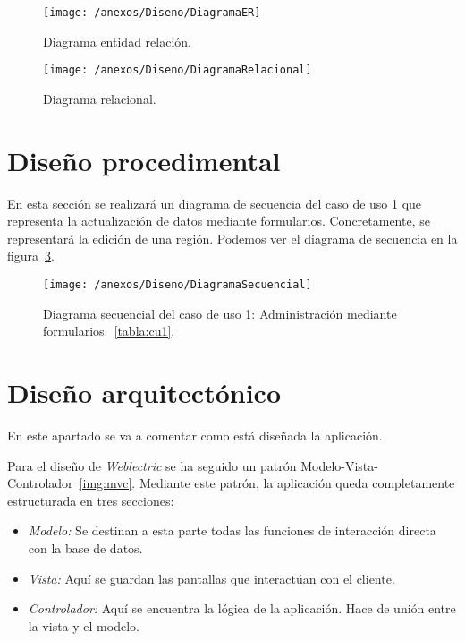 \begin{figure}[h]
	\centering
	\texttt{[image: /anexos/Diseno/DiagramaER]}
	\caption{Diagrama entidad relación.}
	\label{img:modeloER}
\end{figure}

\begin{figure}[h]
	\centering
	\texttt{[image: /anexos/Diseno/DiagramaRelacional]}
	\caption{Diagrama relacional.}
	\label{img:modeloRelacional}
\end{figure}



\newpage

\section{Diseño procedimental}

En esta sección se realizará un diagrama de secuencia del caso de uso 1 que representa la actualización de datos mediante formularios. Concretamente, se representará la edición de una región. Podemos ver el diagrama de secuencia en la figura~\ref{img:modeloSecuencial}.

\begin{figure}[h]
	\centering
	\texttt{[image: /anexos/Diseno/DiagramaSecuencial]}
	\caption{Diagrama secuencial del caso de uso 1: Administración mediante formularios.~\ref{tabla:cu1}.}
	\label{img:modeloSecuencial}
\end{figure}

\newpage

\section{Diseño arquitectónico}

En este apartado se va a comentar como está diseñada la aplicación.

Para el diseño de \textit{Weblectric} se ha seguido un patrón Modelo-Vista-Controlador~\ref{img:mvc}. Mediante este patrón, la aplicación queda completamente estructurada en tres secciones:

\begin{itemize}
	
	\item \textit{Modelo:} Se destinan a esta parte todas las funciones de interacción directa con la base de datos.
	
	\item \textit{Vista:} Aquí se guardan las pantallas que interactúan con el cliente.
	
	\item \textit{Controlador:} Aquí se encuentra la lógica de la aplicación. Hace de unión entre la vista y el modelo.

\end{itemize}

